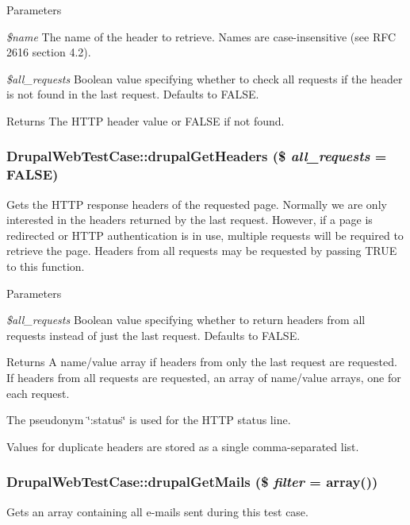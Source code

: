 \begin{DoxyParams}{Parameters}
\item[{\em \$name}]The name of the header to retrieve. Names are case-\/insensitive (see RFC 2616 section 4.2). \item[{\em \$all\_\-requests}]Boolean value specifying whether to check all requests if the header is not found in the last request. Defaults to FALSE. \end{DoxyParams}
\begin{DoxyReturn}{Returns}
The HTTP header value or FALSE if not found. 
\end{DoxyReturn}
\hypertarget{class_drupal_web_test_case_a9bbd6c61b69af17eeb79d59b1632a691}{
\subsubsection[{drupalGetHeaders}]{\setlength{\rightskip}{0pt plus 5cm}DrupalWebTestCase::drupalGetHeaders (\$ {\em all\_\-requests} = {\ttfamily FALSE})}}
\label{class_drupal_web_test_case_a9bbd6c61b69af17eeb79d59b1632a691}
Gets the HTTP response headers of the requested page. Normally we are only interested in the headers returned by the last request. However, if a page is redirected or HTTP authentication is in use, multiple requests will be required to retrieve the page. Headers from all requests may be requested by passing TRUE to this function.


\begin{DoxyParams}{Parameters}
\item[{\em \$all\_\-requests}]Boolean value specifying whether to return headers from all requests instead of just the last request. Defaults to FALSE. \end{DoxyParams}
\begin{DoxyReturn}{Returns}
A name/value array if headers from only the last request are requested. If headers from all requests are requested, an array of name/value arrays, one for each request.
\end{DoxyReturn}
The pseudonym \char`\"{}:status\char`\"{} is used for the HTTP status line.

Values for duplicate headers are stored as a single comma-\/separated list. \hypertarget{class_drupal_web_test_case_af2c147ab7789a251a27aa88a70282432}{
\subsubsection[{drupalGetMails}]{\setlength{\rightskip}{0pt plus 5cm}DrupalWebTestCase::drupalGetMails (\$ {\em filter} = {\ttfamily array()})}}
\label{class_drupal_web_test_case_af2c147ab7789a251a27aa88a70282432}
Gets an array containing all e-\/mails sent during this test case.


